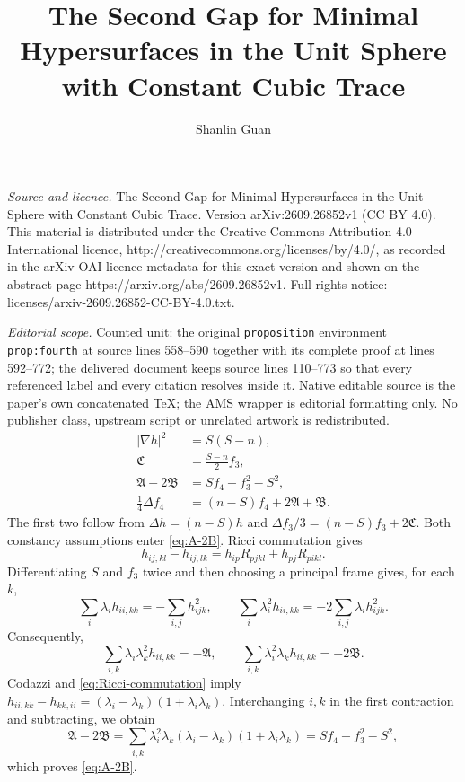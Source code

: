 \documentclass[10pt,a4paper]{amsart}
\numberwithin{equation}{section}
\newcommand{\norm}[1]{\lvert #1\rvert}
\begin{document}
\title[The Second Gap for Minimal Hypersurfaces in the Unit Sphere ]{The Second Gap for Minimal Hypersurfaces in the Unit Sphere with Constant Cubic Trace}
\author{Shanlin Guan}
\date{}
\maketitle
\noindent\emph{Source and licence.} The Second Gap for Minimal Hypersurfaces in the Unit Sphere with Constant Cubic Trace. Version arXiv:2609.26852v1 (CC BY 4.0). This material is distributed under the Creative Commons Attribution 4.0 International licence, http://creativecommons.org/licenses/by/4.0/, as recorded in the arXiv OAI licence metadata for this exact version and shown on the abstract page https://arxiv.org/abs/2609.26852v1. Full rights notice: licenses/arxiv-2609.26852-CC-BY-4.0.txt.\par\smallskip
\noindent\textit{Editorial scope.} Counted unit: the original \texttt{proposition} environment \texttt{prop:fourth} at source lines 558--590 together with its complete proof at lines 592--772; the delivered document keeps source lines 110--773 so that every referenced label and every citation resolves inside it. Native editable source is the paper's own concatenated TeX; the AMS wrapper is editorial formatting only. No publisher class, upstream script or unrelated artwork is redistributed.
\begin{align}
\norm{\nabla h}^2&=S(S-n),\label{eq:grad-h}\\
\mathfrak C&=\frac{S-n}{2}f_3,\label{eq:C-id}\\
\mathfrak A-2\mathfrak B&=Sf_4-f_3^2-S^2,\label{eq:A-2B}\\
\frac14\Delta f_4&=(n-S)f_4+2\mathfrak A+\mathfrak B.
\label{eq:lap-f4}
\end{align}
The first two follow from $\Delta h=(n-S)h$ and
$\Delta f_3/3=(n-S)f_3+2\mathfrak C$. Both constancy assumptions enter
\eqref{eq:A-2B}. Ricci commutation gives
\begin{equation}\label{eq:Ricci-commutation}
h_{ij,kl}-h_{ij,lk}
=h_{ip}R_{pjkl}+h_{pj}R_{pikl}.
\end{equation}
Differentiating $S$ and $f_3$ twice and then choosing a principal frame gives, for each $k$,
\[
\sum_i\lambda_i h_{ii,kk}=-\sum_{i,j}h_{ijk}^2,
\qquad
\sum_i\lambda_i^2h_{ii,kk}=-2\sum_{i,j}\lambda_i h_{ijk}^2.
\]
Consequently,
\[
\sum_{i,k}\lambda_i\lambda_k^2h_{ii,kk}=-\mathfrak A,
\qquad
\sum_{i,k}\lambda_i^2\lambda_kh_{ii,kk}=-2\mathfrak B.
\]
Codazzi and \eqref{eq:Ricci-commutation} imply
$h_{ii,kk}-h_{kk,ii}=(\lambda_i-\lambda_k)(1+\lambda_i\lambda_k)$.
Interchanging $i,k$ in the first contraction and subtracting, we obtain
\[
\mathfrak A-2\mathfrak B
=\sum_{i,k}\lambda_i^2\lambda_k(\lambda_i-\lambda_k)(1+\lambda_i\lambda_k)
=Sf_4-f_3^2-S^2,
\]
which proves \eqref{eq:A-2B}.
\end{document}
